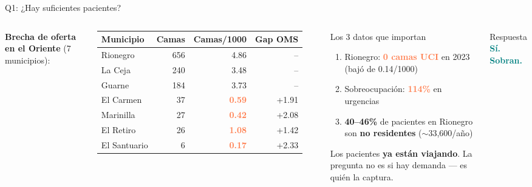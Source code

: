 \documentclass[aspectratio=169, 11pt]{beamer}
\newcommand{\highlight}[1]{\textcolor{teal}{\textbf{#1}}}
\newcommand{\danger}[1]{\textcolor{coral}{\textbf{#1}}}
\newcommand{\src}[1]{\par\vspace{2pt}{\tiny\textcolor{slate}{Fuente: #1}}}
\begin{document}
{
\begin{frame}{Q1: ¿Hay suficientes pacientes?}

\begin{columns}[T]
\vspace{4pt}
{\small\textbf{Brecha de oferta en el Oriente} (7 municipios):}

\vspace{4pt}
{\scriptsize
\begin{tabular}{@{}lrrr@{}}
\toprule
\textbf{Municipio} & \textbf{Camas} & \textbf{Camas/1000} & \textbf{Gap OMS} \\
\midrule
\rowcolor{coral!6}
Rionegro & 656 & 4.86 & -- \\
La Ceja & 240 & 3.48 & -- \\
Guarne & 184 & 3.73 & -- \\
\rowcolor{coral!12}
El Carmen & 37 & \danger{0.59} & +1.91 \\
\rowcolor{coral!12}
Marinilla & 27 & \danger{0.42} & +2.08 \\
\rowcolor{coral!12}
El Retiro & 26 & \danger{1.08} & +1.42 \\
\rowcolor{coral!12}
El Santuario & 6 & \danger{0.17} & +2.33 \\
\bottomrule
\end{tabular}
}

\vspace{4pt}
\src{REPS capacidad instalada (b4dp-ximh), DANE est. 2026}

\vspace{4pt}
\begin{alertblock}{\small Los 3 datos que importan}
\footnotesize
\begin{enumerate}
  \item Rionegro: \danger{0 camas UCI} en 2023 (bajó de 0.14/1000)
  \item Sobreocupación: \danger{114\%} en urgencias
  \item \textbf{40--46\%} de pacientes en Rionegro son \textbf{no residentes} ($\sim$33,600/año)
\end{enumerate}

\vspace{4pt}
Los pacientes \textbf{ya están viajando}. La pregunta no es si hay demanda --- es quién la captura.
\end{alertblock}

\vspace{4pt}
\begin{exampleblock}{\small Respuesta}
\centering\large
\highlight{Sí. Sobran.}
\end{exampleblock}
\end{columns}
\end{frame}
}
\end{document}

